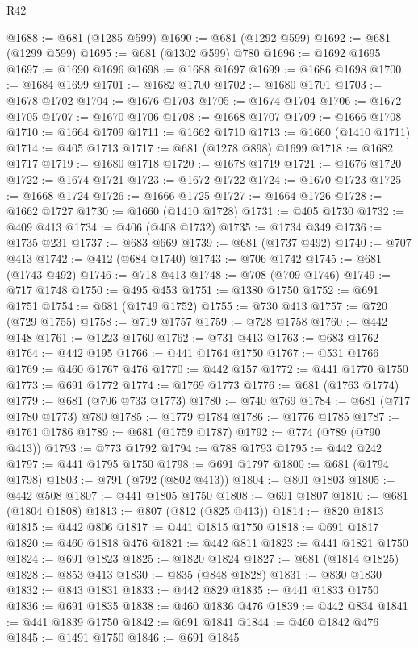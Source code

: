 \begin{lexlean}{R42}
\begin{coremodule}
@1688 := @681 (@1285 @599)
@1690 := @681 (@1292 @599)
@1692 := @681 (@1299 @599)
@1695 := @681 (@1302 @599) @780
@1696 := @1692 @1695
@1697 := @1690 @1696
@1698 := @1688 @1697
@1699 := @1686 @1698
@1700 := @1684 @1699
@1701 := @1682 @1700
@1702 := @1680 @1701
@1703 := @1678 @1702
@1704 := @1676 @1703
@1705 := @1674 @1704
@1706 := @1672 @1705
@1707 := @1670 @1706
@1708 := @1668 @1707
@1709 := @1666 @1708
@1710 := @1664 @1709
@1711 := @1662 @1710
@1713 := @1660 (@1410 @1711)
@1714 := @405 @1713
@1717 := @681 (@1278 @898) @1699
@1718 := @1682 @1717
@1719 := @1680 @1718
@1720 := @1678 @1719
@1721 := @1676 @1720
@1722 := @1674 @1721
@1723 := @1672 @1722
@1724 := @1670 @1723
@1725 := @1668 @1724
@1726 := @1666 @1725
@1727 := @1664 @1726
@1728 := @1662 @1727
@1730 := @1660 (@1410 @1728)
@1731 := @405 @1730
@1732 := @409 @413
@1734 := @406 (@408 @1732)
@1735 := @1734 @349
@1736 := @1735 @231
@1737 := @683 @669
@1739 := @681 (@1737 @492)
@1740 := @707 @413
@1742 := @412 (@684 @1740)
@1743 := @706 @1742
@1745 := @681 (@1743 @492)
@1746 := @718 @413
@1748 := @708 (@709 @1746)
@1749 := @717 @1748
@1750 := @495 @453
@1751 := @1380 @1750
@1752 := @691 @1751
@1754 := @681 (@1749 @1752)
@1755 := @730 @413
@1757 := @720 (@729 @1755)
@1758 := @719 @1757
@1759 := @728 @1758
@1760 := @442 @148
@1761 := @1223 @1760
@1762 := @731 @413
@1763 := @683 @1762
@1764 := @442 @195
@1766 := @441 @1764 @1750
@1767 := @531 @1766
@1769 := @460 @1767 @476
@1770 := @442 @157
@1772 := @441 @1770 @1750
@1773 := @691 @1772
@1774 := @1769 @1773
@1776 := @681 (@1763 @1774)
@1779 := @681 (@706 @733 @1773)
@1780 := @740 @769
@1784 := @681 (@717 @1780 @1773) @780
@1785 := @1779 @1784
@1786 := @1776 @1785
@1787 := @1761 @1786
@1789 := @681 (@1759 @1787)
@1792 := @774 (@789 (@790 @413))
@1793 := @773 @1792
@1794 := @788 @1793
@1795 := @442 @242
@1797 := @441 @1795 @1750
@1798 := @691 @1797
@1800 := @681 (@1794 @1798)
@1803 := @791 (@792 (@802 @413))
@1804 := @801 @1803
@1805 := @442 @508
@1807 := @441 @1805 @1750
@1808 := @691 @1807
@1810 := @681 (@1804 @1808)
@1813 := @807 (@812 (@825 @413))
@1814 := @820 @1813
@1815 := @442 @806
@1817 := @441 @1815 @1750
@1818 := @691 @1817
@1820 := @460 @1818 @476
@1821 := @442 @811
@1823 := @441 @1821 @1750
@1824 := @691 @1823
@1825 := @1820 @1824
@1827 := @681 (@1814 @1825)
@1828 := @853 @413
@1830 := @835 (@848 @1828)
@1831 := @830 @1830
@1832 := @843 @1831
@1833 := @442 @829
@1835 := @441 @1833 @1750
@1836 := @691 @1835
@1838 := @460 @1836 @476
@1839 := @442 @834
@1841 := @441 @1839 @1750
@1842 := @691 @1841
@1844 := @460 @1842 @476
@1845 := @1491 @1750
@1846 := @691 @1845

\end{coremodule}
\end{lexlean}
